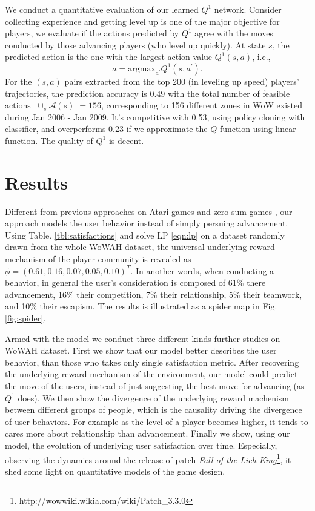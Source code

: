 \documentclass{sigchi}
\begin{document}
We conduct a quantitative evaluation of our learned $Q^1$ network. Consider collecting experience and getting level up is one of the major objective for players, we evaluate if the actions predicted by $Q^1$ agree with the moves conducted by those advancing players (who level up quickly). At state $s$, the predicted action is the one with the largest action-value $Q^1(s,a)$, i.e.,
\begin{equation*}
a = \text{argmax}_{a^\prime}Q^1(s,a^\prime).
\end{equation*}
For the $(s,a)$ pairs extracted from the top 200 (in leveling up speed) players' trajectories, the prediction accuracy is 0.49 with the total number of feasible actions $|\cup_s\mathcal{A}(s)|=156$, corresponding to 156 different zones in WoW existed during Jan 2006 - Jan 2009. It's competitive with 0.53, using policy cloning \cite{amit2002parametric,sammut1992learning} with classifier, and overperforms 0.23 if we approximate the $Q$ function using linear function. The quality of $Q^1$ is decent.

\section{Results}

Different from previous approaches on Atari games \cite{mnih2015human} and zero-sum games \cite{silver2016mastering,heinrich2016deep}, our approach models the user behavior instead of simply persuing advancement. Using Table. \ref{tbl:satisfactions} and solve LP \eqref{eqn:lp} on a dataset randomly drawn from the whole WoWAH dataset, the universal underlying reward mechanism of the player community is revealed as $\phi=(0.61, 0.16, 0.07, 0.05, 0.10)^T$. In another words, when conducting a behavior, in general the user's consideration is composed of 61\% there advancement, 16\% their competition, 7\% their relationship, 5\% their teamwork, and 10\% their escapism. The results is illustrated as a spider map in Fig. \ref{fig:spider}.

Armed with the model we conduct three different kinds further studies on WoWAH dataset. First we show that our model better describes the user behavior, than those who takes only single satisfaction metric. After recovering the underlying reward mechanism of the environment, our model could predict the move of the users, instead of just suggesting the best move for advancing (as $Q^1$ does). We then show the divergence of the underlying reward machenism between different groups of people, which is the causality driving the divergence of user behaviors. For example as the level of a player becomes higher, it tends to cares more about relationship than advancement. Finally we show, using our model, the evolution of underlying user satisfaction over time. Especially, observing the dynamics around the release of patch \textit{Fall of the Lich King}\footnote{http://wowwiki.wikia.com/wiki/Patch\_3.3.0}, it shed some light on quantitative models of the game design.
\end{document}
